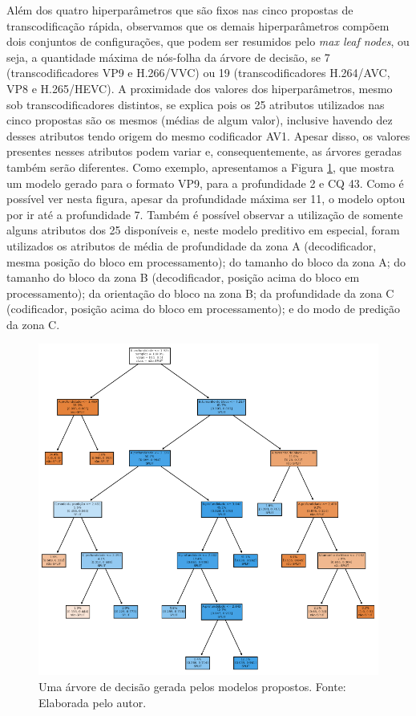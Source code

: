 Além dos quatro hiperparâmetros que são fixos nas cinco propostas de transcodificação rápida, observamos que os demais hiperparâmetros compõem dois conjuntos de configurações, que podem ser resumidos pelo \textit{max leaf nodes}, ou seja, a quantidade máxima de nós-folha da árvore de decisão, se 7 (transcodificadores VP9 e H.266/VVC) ou 19 (transcodificadores H.264/AVC, VP8 e H.265/HEVC). A proximidade dos valores dos hiperparâmetros, mesmo sob transcodificadores distintos, se explica pois os 25 atributos utilizados nas cinco propostas são os mesmos (médias de algum valor), inclusive havendo dez desses atributos tendo origem do mesmo codificador AV1. Apesar disso, os valores presentes nesses atributos podem variar e, consequentemente, as árvores geradas também serão diferentes. Como exemplo, apresentamos a Figura \ref{fig:34}, que mostra um modelo gerado para o formato VP9, para a profundidade 2 e CQ 43. Como é possível ver nesta figura, apesar da profundidade máxima ser 11, o modelo optou por ir até a profundidade 7. Também é possível observar a utilização de somente alguns atributos dos 25 disponíveis e, neste modelo preditivo em especial, foram utilizados os atributos de média de profundidade da zona A (decodificador, mesma posição do bloco em processamento); do tamanho do bloco da zona A; do tamanho do bloco da zona B (decodificador, posição acima do bloco em processamento); da orientação do bloco na zona B; da profundidade da zona C (codificador, posição acima do bloco em processamento); e do modo de predição da zona C.

\begin{figure}
    \centering
    \includegraphics[width=\textwidth]{FIGURES/fig_34.png}
    \caption{Uma árvore de decisão gerada pelos modelos propostos. Fonte: Elaborada pelo autor.}
    \label{fig:34}
\end{figure}

